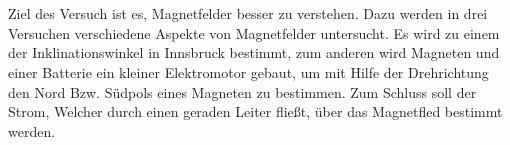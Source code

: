 \section*{\abstractname}
\label{sec:zusammenfassung}


Ziel des Versuch ist es, Magnetfelder besser zu verstehen. Dazu werden in drei Versuchen verschiedene Aspekte von Magnetfelder untersucht. Es wird zu einem der Inklinationswinkel in Innsbruck bestimmt, zum anderen wird Magneten und einer Batterie ein kleiner Elektromotor gebaut, um mit Hilfe der Drehrichtung den Nord Bzw. Südpols eines Magneten zu bestimmen. Zum Schluss soll der Strom, Welcher durch einen geraden Leiter fließt, über das Magnetfled bestimmt werden.

\vspace{3cm}
